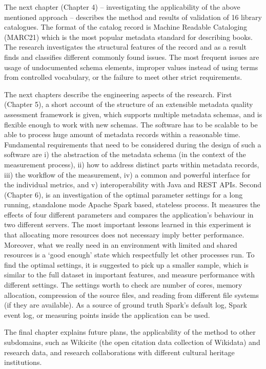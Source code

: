The next chapter (Chapter 4) -- investigating the applicability of the above mentioned approach -- describes the method and results of validation of 16 library catalogues. The format of the catalog record is Machine Readable Cataloging (MARC21) which is the most popular metadata standard for describing books. The research investigates the structural features of the record and as a result finds and classifies different commonly found issues. The most frequent issues are usage of undocumented schema elements, improper values instead of using terms from controlled vocabulary, or the failure to meet other strict requirements.

The next chapters describe the engineering aspects of the research. First (Chapter 5), a short account of the structure of an extensible metadata quality assessment framework is given, which supports multiple metadata schemas, and is flexible enough to work with new schemas. The software has to be scalable to be able to process huge amount of metadata records within a reasonable time. Fundamental requirements that need to be considered during the design of such a software are i) the abstraction of the metadata schema (in the context of the measurement process), ii) how to address distinct parts within metadata records, iii) the workflow of the measurement, iv) a common and powerful interface for the individual metrics, and v) interoperability with Java and REST APIs. Second (Chapter 6), is an investigation of the optimal parameter settings for a long running, standalone mode Apache Spark based, stateless process. It measures the effects of four different parameters and compares the application's behaviour in two different servers. The most important lessons learned in this experiment is that allocating more resources does not necessary imply better performance. Moreover, what we really need in an environment with limited and shared resources is a `good enough' state which respectfully let other processes run. To find the optimal settings, it is suggested to pick up a smaller sample, which is similar to the full dataset in important features, and measure performance with different settings. The settings worth to check are number of cores, memory allocation, compression of the source files, and reading from different file systems (if they are available). As a source of ground truth Spark's default log, Spark event log, or measuring points inside the application can be used.

The final chapter explains future plans, the applicability of the method to other subdomains, such as Wikicite (the open citation data collection of Wikidata) and research data, and research collaborations with different cultural heritage institutions.

